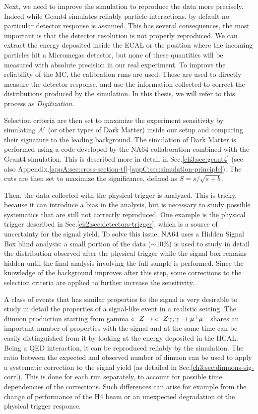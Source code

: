 Next, we need to improve the simulation to reproduce the data more precisely. Indeed while Geant4 simulates reliably particle interactions, by default no particular detector response is assumed. This has several consequences, the most important is that the detector resolution is not properly reproduced. We can extract the energy deposited inside the ECAL or the position where the incoming particles hit a Micromegas detector, but none of these quantities will be measured with absolute precision in our real experiment. To improve the reliability of the MC, the calibration runs are used. These are used to directly measure the detector response, and use the information collected to correct the distributions produced by the simulation. In this thesis, we will refer to this process as \textit{Digitization}.

Selection criteria are then set to maximize the experiment sensitivity by simulating $A'$ (or other types of Dark Matter) inside our setup and comparing their signature to the leading background. The simulation of Dark Matter is performed using a code developed by the NA64 collaboration combined with the Geant4 simulation. This is described more in detail in Sec.\ref{ch3:sec:geant4} (see also Appendix.\ref{appA:sec:cross-section-tl}-\ref{appC:sec:simulation-principle}). The cuts are then set to maximize the significance, defined as $S = s/\sqrt{s+b}$.

Then, the data collected with the physical trigger is analyzed. This is tricky, because it can introduce a bias in the analysis, but is necessary to study possible systematics that are still not correctly reproduced. 
One example is the physical trigger described in Sec.\ref{ch2:sec:detectors-trigger}, which is a source of uncertainty for the signal yield. To solve this issue, NA64 uses a Hidden Signal Box blind analysis\cite{blind-analysis}: a small portion of the data ($\sim$10\%) is used to study in detail the distribution observed after the physical trigger while the signal box remains hidden until the final analysis involving the full sample is performed. Since the knowledge of the background improves after this step, some corrections to the selection criteria are applied to further increase the sensitivity.

A class of events that has similar properties to the signal is very desirable to study in detail the properties of a signal-like event in a realistic setting.  The dimuon production starting from gamma $e^- Z \to e^- Z \gamma; \gamma \to \mu^+ \mu^-$ shares an important number of properties with the signal and at the same time can be easily distinguished from it by looking at the energy deposited in the HCAL. Being a QED interaction, it can be reproduced reliably by the simulation. The ratio between the expected and observed number of dimuon can be used to apply a systematic correction to the signal yield (as detailed in Sec.\ref{ch3:sec:dimuons-sig-corr}). This is done for each run separately, to account for possible time dependencies of the corrections. Such differences can arise for example from the change of performance of the H4 beam or an unexpected degradation of the physical trigger response.

